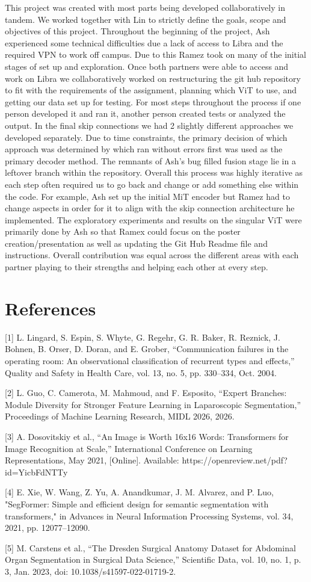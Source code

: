 \documentclass[twocolumn]{article}
\begin{document}
This project was created with most parts being developed collaboratively in tandem. We worked together with Lin to strictly define the goals, scope and objectives of this project. Throughout the beginning of the project, Ash experienced some technical difficulties due a lack of access to Libra and the required VPN to work off campus. Due to this Ramez took on many of the initial stages of set up and exploration. Once both partners were able to access and work on Libra we collaboratively worked on restructuring the git hub repository to fit with the requirements of the assignment, planning which ViT to use, and getting our data set up for testing. For most steps throughout the process if one person developed it and ran it, another person created tests or analyzed the output. In the final skip connections we had 2 slightly different approaches we developed separately. Due to time constraints, the primary decision of which approach was determined by which ran without errors first was used as the primary decoder method. The remnants of Ash's bug filled fusion stage lie in a leftover branch within the repository. Overall this process was highly iterative as each step often required us to go back and change or add something else within the code. For example, Ash set up the initial MiT encoder but Ramez had to change aspects in order for it to align with the skip connection architecture he implemented. The exploratory experiments and results on the singular ViT were primarily done by Ash so that Ramex could focus on the poster creation/presentation as well as updating the Git Hub Readme file and instructions. Overall contribution was equal across the different areas with each partner playing to their strengths and helping each other at every step.

\section{References}

[1] 	L. Lingard, S. Espin, S. Whyte, G. Regehr, G. R. Baker, R. Reznick, J. Bohnen, B. Orser, D. Doran, and E. Grober, “Communication failures in the operating room: An observational classification of recurrent types and effects,” Quality and Safety in Health Care, vol. 13, no. 5, pp. 330–334, Oct. 2004.

[2] L. Guo, C. Camerota, M. Mahmoud, and F. Esposito, “Expert Branches: Module Diversity for Stronger Feature Learning in Laparoscopic Segmentation,” Proceedings of Machine Learning Research, MIDL 2026, 2026.

[3] A. Dosovitskiy et al., “An Image is Worth 16x16 Words: Transformers for Image Recognition at Scale,” International Conference on Learning Representations, May 2021, [Online]. Available: https://openreview.net/pdf?id=YicbFdNTTy

[4] E. Xie, W. Wang, Z. Yu, A. Anandkumar, J. M. Alvarez, and P. Luo, "SegFormer: Simple and efficient design for semantic segmentation with transformers," in Advances in Neural Information Processing Systems, vol. 34, 2021, pp. 12077–12090. 

[5] M. Carstens et al., “The Dresden Surgical Anatomy Dataset for Abdominal Organ Segmentation in Surgical Data Science,” Scientific Data, vol. 10, no. 1, p. 3, Jan. 2023, doi: 10.1038/s41597-022-01719-2.
\end{document}
